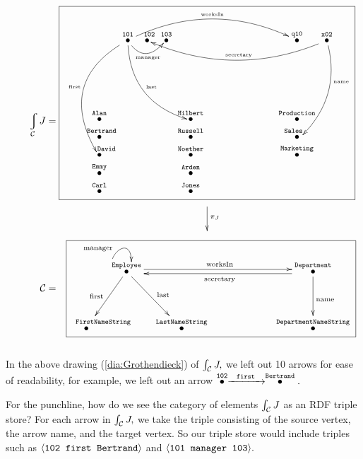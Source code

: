 \documentclass[CT4S-EN-RU]{subfiles}
\begin{document}
\begin{applicationENG}
\begin{align}\label{dia:Grothendieck}
\hspace{0in}\varint_\mcC J=\parbox{3.9in}{
\fbox{
\xymatrix@=.1pt{
&\LTO{101}\ar@/_2.5pc/[ddddl]+<-3pt,3pt>_{\tin{first}}\ar@/_1.5pc/[ddrrr]+<-4pt,0pt>^{\tin{last}}\ar@/_1pc/[rr]+<-3pt,-3pt>_-{\tin{manager}}\ar@/^1.8pc/[rrrrrr]^{\tin{worksIn}}&\LTO{\;\;102}&\LTO{103}&&&&\LTO{q10}&\LTO{x02}\ar@/^1.6pc/[llllll]+<4pt,-2pt>_{\tin{secretary}}\ar@/^1.2pc/[lddd]+<6pt,2pt>^(.4){\tin{name}}\\\parbox{.1in}{~\\\vspace{.6in}~}\\\LTO{Alan}&&&&\LTO{Hilbert}&\hspace{.4in}&\hspace{.4in}&\LTO{Production}\\\LTO{\;\;Bertrand}&&&&\LTO{Russell}&&&\LTO{\hspace{-.1in}Sales}\\\LTO{\hspace{.2in}David}&&&&\LTO{Noether}&&&\LTO{Marketing}\\\LTO{Emmy}&&&&\LTO{Arden}\\\LTO{Carl}&&&&\LTO{Jones}}}\\
\xymatrix{\hspace{1.6in}&\ar[d]^{\pi_J}\\&~}}\\
\nonumber \mcC=\parbox{3.9in}{\hspace{.1in}\fbox{
			\xymatrix@=9pt{&\LTO{Employee}\ar@<.5ex>[rrrrr]^{\tn{worksIn}}\ar@(l,u)[]+<5pt,10pt>^{\tn{manager}}\ar[dddl]_{\tn{first}}\ar[dddr]^{\tn{last}}&&&\hspace{0in}&&\LTO{Department}\ar@<.5ex>[lllll]^{\tn{secretary}}\ar[ddd]^{\tn{name}}\\\\\\\LTO{\parbox{.3in}{\tt \scriptsize FirstNameString}}&&\LTO{LastNameString}&~&~&~&\LTO{DepartmentNameString}
			}}}
\end{align}~\\

In the above drawing (\ref{dia:Grothendieck}) of $\int_\mathcal{C} J,$ we left out 10 arrows for ease of readability, for example, we left out an arrow $\stackrel{\tt{102}}{\bullet}\xrightarrow{\ \ \tt first\ \ }\stackrel{\tt{Bertrand}}{\bullet}.$

For the punchline, how do we see the category of elements $\int_\mathcal{C} J$ as an RDF triple store? For each arrow in $\int_\mathcal{C} J,$ we take the triple consisting of the source vertex, the arrow name, and the target vertex. So our triple store would include triples such as $\langle{\tt 102\;\; first\;\; Bertrand}\rangle$ and $\langle{\tt 101\;\; manager\;\; 103}\rangle.$
\end{applicationENG}
\end{document}
